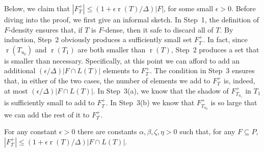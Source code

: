 \documentclass{patmorin}
\DeclareMathOperator{\rank}{r}
\begin{document}
Below, we claim that $|F^+_T|\le (1+\epsilon \rank(T)/\Delta)|F|$, for
some small $\epsilon >0$.  Before diving into the proof, we first give an
informal sketch.  In Step~1, the definition of $F$-density ensures that,
if $T$ is $F$-dense, then it safe to discard all of $T$.  By induction,
Step~2 obviously produces a sufficiently small set $F^+_T$.  In fact,
since $\rank(T_{u_0})$ and $\rank(T_1)$ are both smaller than $\rank(T)$,
Step~2 produces a set that is smaller than necessary. Specifically, at this
point we can afford to add an additional $(\epsilon/\Delta)|F\cap L(T)|$
elements to $F^+_T$.  The condition in Step~3 ensures that, in either
of the two cases, the number of elements we add to $F^+_T$ is, indeed,
at most $(\epsilon/\Delta)|F\cap L(T)|$.  In Step~3(a), we know that
the shadow of $F^+_{T_{u_1}}$ in $T_1$ is sufficiently small to add
to $F^+_T$.  In Step~3(b) we know that $F^+_{T_{u_0}}$ is so large that
we can add the rest of it to $F^+_T$.

\begin{clm}
   For any constant $\epsilon>0$ there are constants
   $\alpha,\beta,\zeta,\eta >0$ such that, for any $F\subseteq P$,
   $|F^+_T| \le (1+\epsilon\rank(T)/\Delta)|F\cap L(T)|$.
\end{clm}
\end{document}
